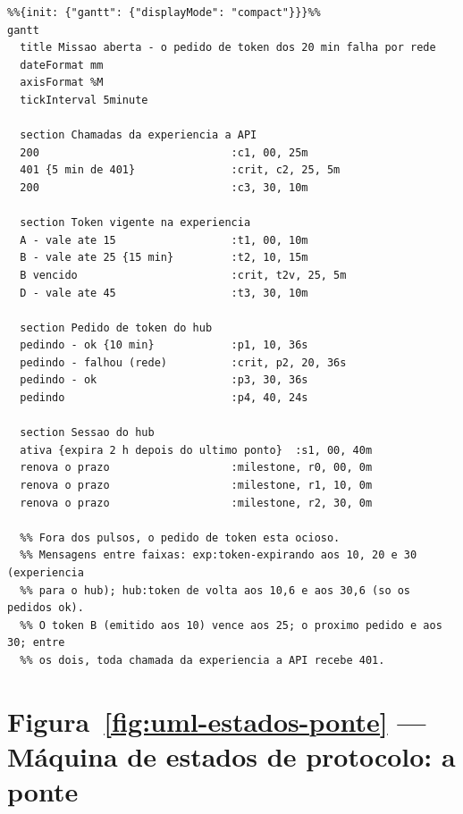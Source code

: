 \begin{lstlisting}[language=mermaid]
%% aproximacao: o Mermaid nao tem diagrama de tempo; cada faixa vira uma secao do gantt e cada estado um intervalo no eixo de minutos, e as mensagens entre faixas ficam em comentario.
%%{init: {"gantt": {"displayMode": "compact"}}}%%
gantt
  title Missao aberta - o pedido de token dos 20 min falha por rede
  dateFormat mm
  axisFormat %M
  tickInterval 5minute

  section Chamadas da experiencia a API
  200                              :c1, 00, 25m
  401 {5 min de 401}               :crit, c2, 25, 5m
  200                              :c3, 30, 10m

  section Token vigente na experiencia
  A - vale ate 15                  :t1, 00, 10m
  B - vale ate 25 {15 min}         :t2, 10, 15m
  B vencido                        :crit, t2v, 25, 5m
  D - vale ate 45                  :t3, 30, 10m

  section Pedido de token do hub
  pedindo - ok {10 min}            :p1, 10, 36s
  pedindo - falhou (rede)          :crit, p2, 20, 36s
  pedindo - ok                     :p3, 30, 36s
  pedindo                          :p4, 40, 24s

  section Sessao do hub
  ativa {expira 2 h depois do ultimo ponto}  :s1, 00, 40m
  renova o prazo                   :milestone, r0, 00, 0m
  renova o prazo                   :milestone, r1, 10, 0m
  renova o prazo                   :milestone, r2, 30, 0m

  %% Fora dos pulsos, o pedido de token esta ocioso.
  %% Mensagens entre faixas: exp:token-expirando aos 10, 20 e 30 (experiencia
  %% para o hub); hub:token de volta aos 10,6 e aos 30,6 (so os pedidos ok).
  %% O token B (emitido aos 10) vence aos 25; o proximo pedido e aos 30; entre
  %% os dois, toda chamada da experiencia a API recebe 401.
\end{lstlisting}

\section{Figura~\ref{fig:uml-estados-ponte} --- Máquina de estados de protocolo: a ponte}

